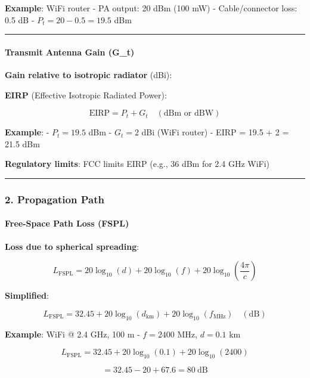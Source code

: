 \textbf{Example}: WiFi router - PA output: 20 dBm (100 mW) -
Cable/connector loss: 0.5 dB - \(P_t = 20 - 0.5 = 19.5\) dBm

\begin{center}\rule{0.5\linewidth}{0.5pt}\end{center}

\paragraph{Transmit Antenna Gain
(G\_t)}\label{transmit-antenna-gain-g_t}

\textbf{Gain relative to isotropic radiator} (dBi):

\textbf{EIRP} (Effective Isotropic Radiated Power):

\[
\text{EIRP} = P_t + G_t \quad (\text{dBm or dBW})
\]

\textbf{Example}: - \(P_t = 19.5\) dBm - \(G_t = 2\) dBi (WiFi router) -
EIRP = 19.5 + 2 = 21.5 dBm

\textbf{Regulatory limits}: FCC limits EIRP (e.g., 36 dBm for 2.4 GHz
WiFi)

\begin{center}\rule{0.5\linewidth}{0.5pt}\end{center}

\subsubsection{2. Propagation Path}\label{propagation-path}

\paragraph{Free-Space Path Loss (FSPL)}\label{free-space-path-loss-fspl}

\textbf{Loss due to spherical spreading}:

\[
L_{\text{FSPL}} = 20\log_{10}(d) + 20\log_{10}(f) + 20\log_{10}\left(\frac{4\pi}{c}\right)
\]

\textbf{Simplified}:

\[
L_{\text{FSPL}} = 32.45 + 20\log_{10}(d_{\text{km}}) + 20\log_{10}(f_{\text{MHz}}) \quad (\text{dB})
\]

\textbf{Example}: WiFi @ 2.4 GHz, 100 m - \(f = 2400\) MHz, \(d = 0.1\)
km

\[
L_{\text{FSPL}} = 32.45 + 20\log_{10}(0.1) + 20\log_{10}(2400)
\]

\[
= 32.45 - 20 + 67.6 = 80\ \text{dB}
\]

